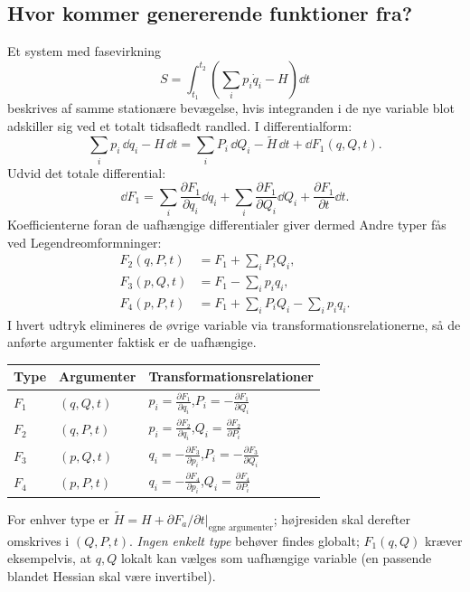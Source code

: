 \subsection{Hvor kommer genererende funktioner fra?}
Et system med fasevirkning
\[
S=\int_{t_1}^{t_2}\left(\sum_i p_i\dot q_i-H\right)\dd t
\]
beskrives af samme stationære bevægelse, hvis integranden i de nye variable blot adskiller sig ved et totalt tidsafledt randled. I differentialform:
\[
\sum_i p_i\,\dd q_i-H\,\dd t=
\sum_iP_i\,\dd Q_i-\widetilde H\,\dd t+\dd F_1(q,Q,t).
\]
Udvid det totale differential:
\[
\dd F_1=\sum_i\frac{\partial F_1}{\partial q_i}\dd q_i+
\sum_i\frac{\partial F_1}{\partial Q_i}\dd Q_i+
\frac{\partial F_1}{\partial t}\dd t.
\]
Koefficienterne foran de uafhængige differentialer giver dermed
Andre typer fås ved Legendreomformninger:
\begin{align*}
F_2(q,P,t)&=F_1+\sum_iP_iQ_i,\\
F_3(p,Q,t)&=F_1-\sum_ip_iq_i,\\
F_4(p,P,t)&=F_1+\sum_iP_iQ_i-\sum_ip_iq_i.
\end{align*}
I hvert udtryk elimineres de øvrige variable via transformationsrelationerne, så de anførte argumenter faktisk er de uafhængige.
\begin{center}\small\renewcommand{\arraystretch}{1.16}
\begin{tabular}{p{15mm}p{30mm}p{94mm}}\toprule
Type & Argumenter & Transformationsrelationer\\\midrule
$F_1$ & $(q,Q,t)$ & $p_i=\frac{\partial F_1}{\partial q_i}$,\quad $P_i=-\frac{\partial F_1}{\partial Q_i}$\\
$F_2$ & $(q,P,t)$ & $p_i=\frac{\partial F_2}{\partial q_i}$,\quad $Q_i=\frac{\partial F_2}{\partial P_i}$\\
$F_3$ & $(p,Q,t)$ & $q_i=-\frac{\partial F_3}{\partial p_i}$,\quad $P_i=-\frac{\partial F_3}{\partial Q_i}$\\
$F_4$ & $(p,P,t)$ & $q_i=-\frac{\partial F_4}{\partial p_i}$,\quad $Q_i=\frac{\partial F_4}{\partial P_i}$\\\bottomrule
\end{tabular}\end{center}
For enhver type er $\widetilde H=H+\left.\partial F_a/\partial t\right|_{\text{egne argumenter}}$; højresiden skal derefter omskrives i $(Q,P,t)$. \emph{Ingen enkelt type} behøver findes globalt; $F_1(q,Q)$ kræver eksempelvis, at $q,Q$ lokalt kan vælges som uafhængige variable (en passende blandet Hessian skal være invertibel).

